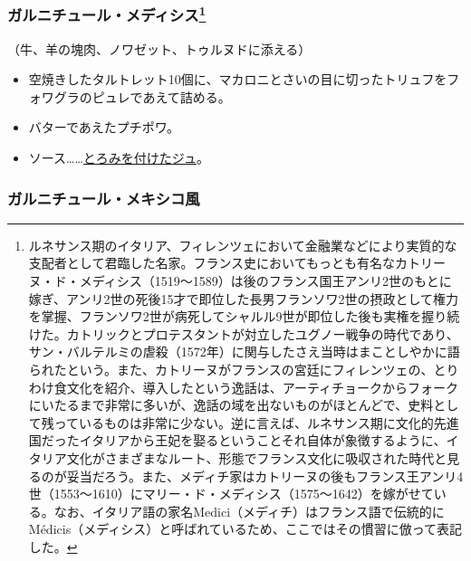 \begin{recette}
{\subsubsection[ガルニチュール・メディシス]{\texorpdfstring{ガルニチュール・メディシス\footnote{ルネサンス期のイタリア、フィレンツェにおいて金融業などにより実質的な支配者として君臨した名家。フランス史においてもっとも有名なカトリーヌ・ド・メディシス（1519〜1589）は後のフランス国王アンリ2世のもとに嫁ぎ、アンリ2世の死後15才で即位した長男フランソワ2世の摂政として権力を掌握、フランソワ2世が病死してシャルル9世が即位した後も実権を握り続けた。カトリックとプロテスタントが対立したユグノー戦争の時代であり、サン・バルテルミの虐殺（1572年）に関与したさえ当時はまことしやかに語られたという。また、カトリーヌがフランスの宮廷にフィレンツェの、とりわけ食文化を紹介、導入したという逸話は、アーティチョークからフォークにいたるまで非常に多いが、逸話の域を出ないものがほとんどで、史料として残っているものは非常に少ない。逆に言えば、ルネサンス期に文化的先進国だったイタリアから王妃を娶るということそれ自体が象徴するように、イタリア文化がさまざまなルート、形態でフランス文化に吸収された時代と見るのが妥当だろう。また、メディチ家はカトリーヌの後もフランス王アンリ4世（1553〜1610）にマリー・ド・メディシス（1575〜1642）を嫁がせている。なお、イタリア語の家名Medici（メディチ）はフランス語で伝統的にMédicis（メディシス）と呼ばれているため、ここではその慣習に倣って表記した。}}{ガルニチュール・メディシス}}\label{garniture-medicis}}



（牛、羊の塊肉、ノワゼット、トゥルヌドに添える）

\begin{itemize}
\item
  空焼きしたタルトレット10個に、マカロニとさいの目に切ったトリュフをフォワグラのピュレであえて詰める。
\item
  バターであえたプチポワ。
\item
  ソース\ldots{}\ldots{}\protect\hyperlink{jus-de-veau-lie}{とろみを付けたジュ}。
\end{itemize}

\hypertarget{garniture-a-la-mexicaine}{%
\subsubsection{ガルニチュール・メキシコ風}\label{garniture-a-la-mexicaine}}


\end{recette}
